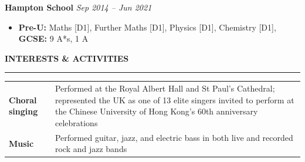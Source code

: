 \documentclass[11pt, a4paper]{article}
\newcommand{\cvsection}[1]{%
  \vspace{7pt}%
  {\small\bfseries\color{navy}\MakeUppercase{#1}}\par%
  \nopagebreak\vspace{-8pt}%
  {\color{navy}\rule{\linewidth}{0.4pt}}\par%
  \vspace{3pt}%
}
\newcommand{\jobheader}[3]{%
  \vspace{4pt}%
  \noindent\textbf{#1}%
  \ifx\relax#2\relax\else{\color{mygray}\ \ |\ \ #2}\fi%
  \hfill{\color{mygray}\small\textit{#3}}\par%
  \vspace{1pt}%
}
\begin{document}
\jobheader{Hampton School}{}{Sep 2014 -- Jun 2021}
\begin{itemize}
  \item \textbf{Pre-U:} Maths [D1], Further Maths [D1], Physics [D1], Chemistry [D1], \textbf{GCSE:} 9 A*s, 1 A \\
\end{itemize}

\cvsection{Interests \& Activities}

\vspace{1pt}
\begin{tabularx}{\textwidth}{@{}lX@{}}
  \textbf{Choral singing} & Performed at the Royal Albert Hall and St Paul's Cathedral;
                            represented the UK as one of 13 elite singers invited to perform
                            at the Chinese University of Hong Kong's 60th anniversary
                            celebrations \\
  \textbf{Music}          & Performed guitar, jazz, and electric bass in both live and recorded rock and jazz bands \\
\end{tabularx}
\end{document}
